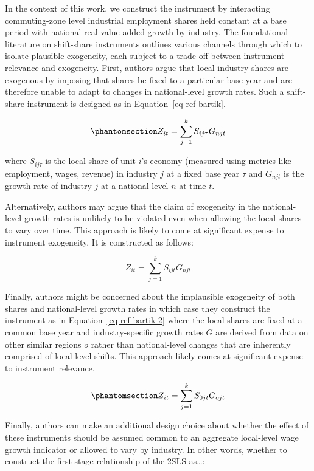 \documentclass[
  10pt,
]{article}
\begin{document}
In the context of this work, we construct the instrument by interacting
commuting-zone level industrial employment shares held constant at a
base period with national real value added growth by industry. The
foundational literature on shift-share instruments outlines various
channels through which to isolate plausible exogeneity, each subject to
a trade-off between instrument relevance and exogeneity. First, authors
argue that local industry shares are exogenous by imposing that shares
be fixed to a particular base year and are therefore unable to adapt to
changes in national-level growth rates. Such a shift-share instrument is
designed as in Equation~\ref{eq-ref-bartik}.

\begin{equation}\protect\phantomsection\label{eq-ref-bartik}{
Z_{it} = \sum_{j=1}^{k} S_{ij\tau}G_{njt}
}\end{equation}

where \(S_{ij\tau}\) is the local share of unit \(i\)'s economy
(measured using metrics like employment, wages, revenue) in industry
\(j\) at a fixed base year \(\tau\) and \(G_{njt}\) is the growth rate
of industry \(j\) at a national level \(n\) at time \(t\).

Alternatively, authors may argue that the claim of exogeneity in the
national-level growth rates is unlikely to be violated even when
allowing the local shares to vary over time. This approach is likely to
come at significant expense to instrument exogeneity. It is constructed
as follows:

\[
Z_{it} = \sum_{j=1}^{k} S_{ijt}G_{njt}
\]

Finally, authors might be concerned about the implausible exogeneity of
both shares and national-level growth rates in which case they construct
the instrument as in Equation~\ref{eq-ref-bartik-2} where the local
shares are fixed at a common base year and industry-specific growth
rates \(G\) are derived from data on other similar regions \(o\) rather
than national-level changes that are inherently comprised of local-level
shifts. This approach likely comes at significant expense to instrument
relevance.

\begin{equation}\protect\phantomsection\label{eq-ref-bartik-2}{
Z_{it} = \sum_{j=1}^{k} S_{0jt}G_{ojt}
}\end{equation}

Finally, authors can make an additional design choice about whether the
effect of these instruments should be assumed common to an aggregate
local-level wage growth indicator or allowed to vary by industry. In
other words, whether to construct the first-stage relationship of the
2SLS as\ldots:
\end{document}
